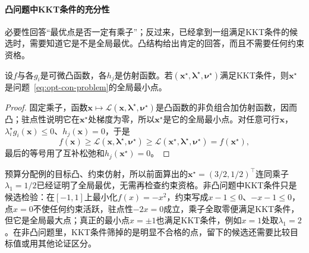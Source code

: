 \paragraph{凸问题中KKT条件的充分性}
必要性回答“最优点是否一定有乘子”；反过来，已经拿到一组满足KKT条件的候选时，需要知道它是不是全局最优。凸结构给出肯定的回答，而且不需要任何约束资格。

\begin{theorem}[凸问题的KKT充分性]
\label{thm:opt-con-kkt-sufficient}
设$f$与各$g_i$是可微凸函数，各$h_j$是仿射函数。若$(\bm x^\star,\bm\lambda^\star,\bm\nu^\star)$满足KKT条件，则$\bm x^\star$是问题~\eqref{eq:opt-con-problem}的全局最小点。
\end{theorem}

\begin{proof}
固定乘子，函数$\bm x\mapsto\mathcal L(\bm x,\bm\lambda^\star,\bm\nu^\star)$是凸函数的非负组合加仿射函数，因而凸；驻点性说明它在$\bm x^\star$处梯度为零，所以$\bm x^\star$是它的全局最小点。对任意可行$\bm x$，$\lambda_i^\star g_i(\bm x)\leq0$、$h_j(\bm x)=0$，于是
\[
  f(\bm x)\geq\mathcal L(\bm x,\bm\lambda^\star,\bm\nu^\star)\geq\mathcal L(\bm x^\star,\bm\lambda^\star,\bm\nu^\star)=f(\bm x^\star),
\]
最后的等号用了互补松弛和$h_j(\bm x^\star)=0$。
\end{proof}

预算分配例的目标凸、约束仿射，所以前面算出的$\bm x^\star=(3/2,1/2)^\top$连同乘子$\lambda_1=1/2$已经证明了全局最优，无需再检查约束资格。非凸问题中KKT条件只是候选检验：在$[-1,1]$上最小化$f(x)=-x^2$，约束写成$x-1\leq0$、$-x-1\leq0$，点$x=0$不使任何约束活跃，驻点性$-2x=0$成立，乘子全取零便满足KKT条件，但它是全局最大点；真正的最小点$x=\pm1$也满足KKT条件，例如$x=1$处取$\lambda_1=2$。在非凸问题里，KKT条件筛掉的是明显不合格的点，留下的候选还需要比较目标值或用其他论证区分。
